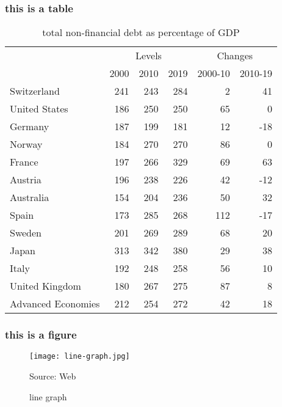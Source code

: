 \documentclass[10pt]{beamer}
\begin{document}
\begin{frame}
\frametitle {this is a table}
\begin{table}
	\centering
	\caption{total non-financial debt as percentage of GDP}
	\begin{tabular}{l|rrr|rr}
		\midrule
		\multicolumn{1}{r}{} & \multicolumn{3}{c|}{Levels} & \multicolumn{2}{c}{Changes} \\
		\cmidrule{2-6}    \multicolumn{1}{r}{} & \multicolumn{1}{c}{2000} & \multicolumn{1}{c}{2010} & \multicolumn{1}{c|}{2019} & \multicolumn{1}{c}{2000-10} & \multicolumn{1}{c}{2010-19} \\
		\midrule
		Switzerland & 241   & 243   & 284   & 2     & 41 \\
		United States & 186   & 250   & 250   & 65    & 0 \\
		Germany & 187   & 199   & 181   & 12    & -18 \\
		Norway & 184   & 270   & 270   & 86    & 0 \\
		France & 197   & 266   & 329   & 69    & 63 \\
		Austria & 196   & 238   & 226   & 42    & -12 \\
		Australia & 154   & 204   & 236   & 50    & 32 \\
		Spain & 173   & 285   & 268   & 112   & -17 \\
		Sweden & 201   & 269   & 289   & 68    & 20 \\
		Japan & 313   & 342   & 380   & 29    & 38 \\
		Italy & 192   & 248   & 258   & 56    & 10 \\
		United Kingdom & 180   & 267   & 275   & 87    & 8 \\
		\midrule
		Advanced Economies\footnotemark[2] & 212   & 254   & 272   & 42    & 18 \\
			\end{tabular}%
	\label{tab:total non financial debt as percentage of GDP}%
\end{table}%

\end{frame}



\begin{frame}
\frametitle{this is a figure}

\begin{figure}[h]
	\centering
	\texttt{[image: line-graph.jpg]}
	\caption{line graph}
	{Source: Web}
	\label{fig:basicgrowthreg}
\end{figure}

\end{frame}
\end{document}
